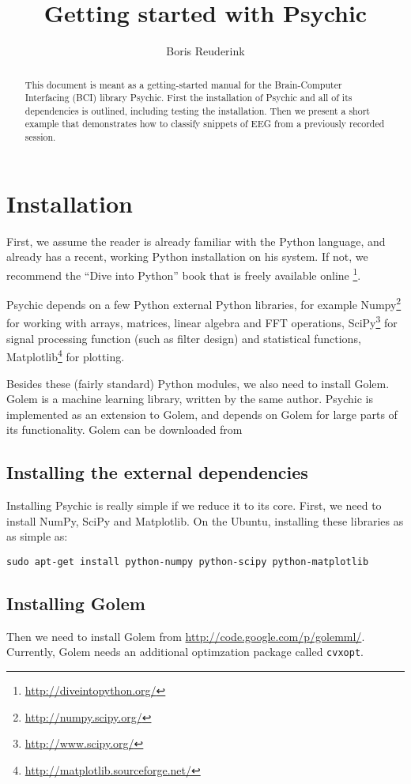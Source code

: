 \documentclass[a4paper]{article}
\title{Getting started with Psychic}
\author{Boris Reuderink}
\begin{document}
\maketitle
\begin{abstract}
This document is meant as a getting-started manual for the Brain-Computer
Interfacing (BCI) library Psychic. First the installation of Psychic and all of its dependencies is outlined, including testing the installation. Then we present a short example that demonstrates how to classify snippets of EEG from a previously recorded session.
\end{abstract}


\section{Installation}
First, we assume the reader is already familiar with the Python language, and
already has a recent, working Python installation on his system. 
If not, we recommend the ``Dive into Python'' book that is freely available
online \footnote{\url{http://diveintopython.org/}}.


Psychic depends on a few Python external Python libraries, for example Numpy\footnote{\url{http://numpy.scipy.org/}} for working with arrays, matrices,
linear algebra and FFT operations, SciPy\footnote{\url{http://www.scipy.org/}}
for signal processing function (such as filter design) and statistical
functions, Matplotlib\footnote{\url{http://matplotlib.sourceforge.net/}} for
plotting.

Besides these (fairly standard) Python modules, we also need to install Golem.
Golem is a machine learning library, written by the same author. Psychic is
implemented as an extension to Golem, and depends on Golem for large parts of
its functionality. Golem can be downloaded from

\subsection{Installing the external dependencies}
Installing Psychic is really simple if we reduce it to its core. First, we need to install NumPy, SciPy and Matplotlib. On the Ubuntu, installing these libraries as as simple as:

\begin{verbatim}
sudo apt-get install python-numpy python-scipy python-matplotlib
\end{verbatim}

\subsection{Installing Golem}
 Then we need to install Golem from \url{http://code.google.com/p/golemml/}.
Currently, Golem needs an additional optimzation package called
\texttt{cvxopt}. 
\end{document}
